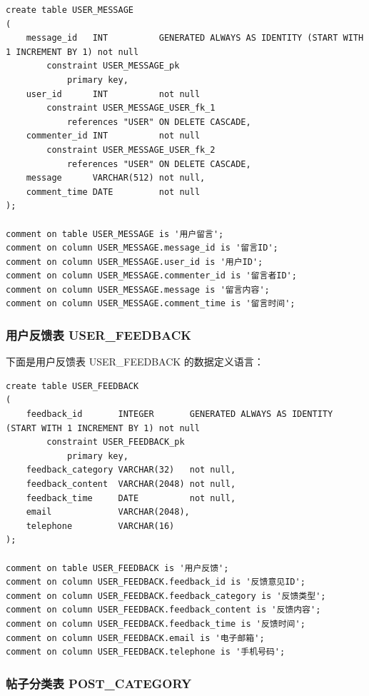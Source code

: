 \begin{verbatim}
create table USER_MESSAGE
(
    message_id   INT          GENERATED ALWAYS AS IDENTITY (START WITH 1 INCREMENT BY 1) not null
        constraint USER_MESSAGE_pk
            primary key,
    user_id      INT          not null
        constraint USER_MESSAGE_USER_fk_1
            references "USER" ON DELETE CASCADE,
    commenter_id INT          not null
        constraint USER_MESSAGE_USER_fk_2
            references "USER" ON DELETE CASCADE,
    message      VARCHAR(512) not null,
    comment_time DATE         not null
);

comment on table USER_MESSAGE is '用户留言';
comment on column USER_MESSAGE.message_id is '留言ID';
comment on column USER_MESSAGE.user_id is '用户ID';
comment on column USER_MESSAGE.commenter_id is '留言者ID';
comment on column USER_MESSAGE.message is '留言内容';
comment on column USER_MESSAGE.comment_time is '留言时间';
\end{verbatim}

\subsubsection{用户反馈表 USER\_FEEDBACK}

下面是用户反馈表 USER\_FEEDBACK 的数据定义语言：

\begin{verbatim}
create table USER_FEEDBACK
(
    feedback_id       INTEGER       GENERATED ALWAYS AS IDENTITY (START WITH 1 INCREMENT BY 1) not null
        constraint USER_FEEDBACK_pk
            primary key,
    feedback_category VARCHAR(32)   not null,
    feedback_content  VARCHAR(2048) not null,
    feedback_time     DATE          not null,
    email             VARCHAR(2048),
    telephone         VARCHAR(16)
);

comment on table USER_FEEDBACK is '用户反馈';
comment on column USER_FEEDBACK.feedback_id is '反馈意见ID';
comment on column USER_FEEDBACK.feedback_category is '反馈类型';
comment on column USER_FEEDBACK.feedback_content is '反馈内容';
comment on column USER_FEEDBACK.feedback_time is '反馈时间';
comment on column USER_FEEDBACK.email is '电子邮箱';
comment on column USER_FEEDBACK.telephone is '手机号码';
\end{verbatim}

\subsubsection{帖子分类表 POST\_CATEGORY}


